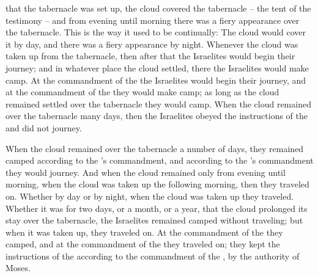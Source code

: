 {that the tabernacle
was set
up, the
cloud
covered
the
tabernacle
– the tent
of the testimony –
and from evening
until
morning
there was a fiery
appearance
over
the tabernacle.
This is the way
it used to be
continually: The cloud
would cover
it by day, and there was a fiery
appearance
by night.
Whenever
the cloud
was taken up
from the tabernacle,
then after
that
the Israelites
would begin
their journey;
and in whatever
place
the cloud
settled,
there
the Israelites
would make camp.
At the commandment
of the {}
the Israelites
would begin their journey,
and at the commandment
of the {}
they would make camp;
as
long
as
the cloud
remained settled
over
the tabernacle
they would camp.
When the cloud
remained
over
the tabernacle
many
days,
then the Israelites
obeyed
the instructions
of the {}
and did not
journey.
\par }{\PP {}When
the cloud
remained over
the tabernacle
a number
of days,
they remained
camped
according
to the
{}’s
commandment, and according to the
{}’s
commandment
they would journey.
And when
the cloud
remained
only from evening
until
morning,
when the cloud
was taken up
the following morning,
then they traveled
on. Whether
by day
or by night,
when the cloud
was taken up
they traveled.
Whether
it was for two days,
or
a month,
or
a year,
that the cloud
prolonged
its stay over
the tabernacle,
the Israelites
remained
camped
without
traveling;
but when it was taken up,
they traveled on.
At the commandment
of the {}
they camped,
and at the commandment
of the {}
they traveled
on; they kept
the instructions
of the {}
according
to the commandment
of the {}, by the authority
of Moses.


}
